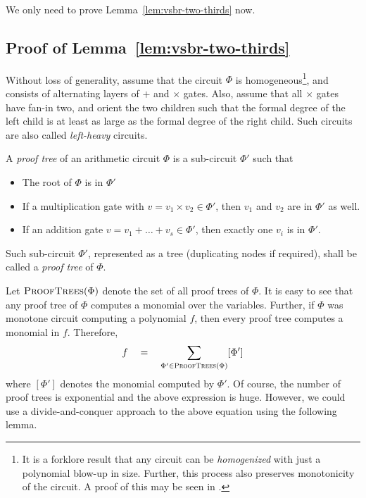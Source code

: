 \documentclass{birkjour}
\providecommand{\DIFaddtex}[1]{{\protect\color{blue}\uwave{#1}}} %
\providecommand{\DIFaddbegin}{} %
\providecommand{\DIFaddend}{} %
\providecommand{\DIFadd}[1]{\texorpdfstring{\DIFaddtex{#1}}{#1}} %
\begin{document}
We only need to prove Lemma~\ref{lem:vsbr-two-thirds} now.

\subsection{Proof of Lemma~\ref{lem:vsbr-two-thirds}}

Without loss of generality, assume that the circuit $\Phi$ is
homogeneous\footnote{It is a forklore result that any circuit can be \emph{homogenized} with just a polynomial blow-up in size. Further, this process also preserves monotonicity of the circuit. A proof of this may be seen in \cite{sy}.}, and consists of alternating layers of $+$ and $\times$
gates. Also, assume that all $\times$ gates have fan-in two, and
orient the two children such that the formal degree of the left child
is at least as large as the formal degree of the right child. Such
circuits are also called \emph{left-heavy} circuits.

\begin{definition}\label{defn:prooftree}
A \emph{proof tree} of an arithmetic circuit $\Phi$ is a sub-circuit $\Phi'$ such that
\begin{itemize}
\item The root of $\Phi$ is in $\Phi'$
\item If a multiplication gate with $v = v_1\times v_2 \in \Phi'$, then $v_1$ and $v_2$ are in $\Phi'$ as well.
\item If an addition gate $v = v_1 + \dots + v_s \in \Phi'$, then
  exactly one $v_i$ is in $\Phi'$.
\end{itemize}
Such \DIFaddbegin \DIFadd{a }\DIFaddend sub-circuit $\Phi'$, represented as a tree (duplicating nodes if
required), shall be called a \emph{proof tree} of $\Phi$.
\end{definition}

\newcommand{\PF}{\textsc{ProofTrees}}

Let $\PF(\Phi)$ denote the set of all proof trees of $\Phi$. It is
easy to see that any proof tree of $\Phi$ computes a monomial over the
variables. Further, if $\Phi$ was \DIFaddbegin \DIFadd{a }\DIFaddend monotone circuit computing a polynomial
$f$, then every proof tree computes a monomial in $f$. Therefore,
$$
f\quad=\quad \sum_{\Phi' \in \PF(\Phi)} [\Phi']
$$
where $[\Phi']$ denotes the monomial computed by $\Phi'$. Of course, the number of proof trees is exponential and the above
expression is huge. However, we could use a divide-and-conquer
approach to the above equation using the following lemma. 
\end{document}
